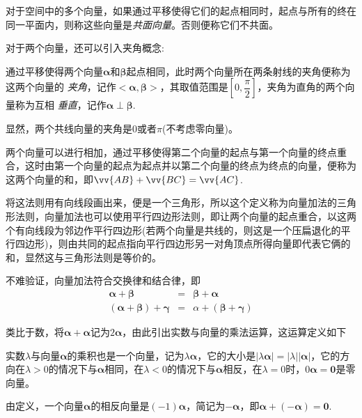 \begin{definition}
  对于空间中的多个向量，如果通过平移使得它们的起点相同时，起点与所有的终在同一平面内，则称这些向量是\emph{共面向量}。否则便称它们不共面。
\end{definition}

对于两个向量，还可以引入夹角概念:
\begin{definition}
  通过平移使得两个向量$\bm{\alpha}$和$\bm{\beta}$起点相同，此时两个向量所在两条射线的夹角便称为这两个向量的 \emph{夹角}，记作$<\bm{\alpha},\bm{\beta}>$，其取值范围是$[0,\dfrac{\pi}{2}]$，夹角为直角的两个向量称为互相 \emph{垂直}，记作$\bm{\alpha} \perp \bm{\beta}$.
\end{definition}

显然，两个共线向量的夹角是0或者$\pi$(不考虑零向量)。

\begin{definition}
两个向量可以进行相加，通过平移使得第二个向量的起点与第一个向量的终点重合，这时由第一个向量的起点为起点并以第二个向量的终点为终点的向量，便称为这两个向量的和，即$\vv{AB}+\vv{BC}=\vv{AC}$.
\end{definition}

将这法则用有向线段画出来，便是一个三角形，所以这个定义称为向量加法的三角形法则，向量加法也可以使用平行四边形法则，即让两个向量的起点重合，以这两个有向线段为邻边作平行四边形(若两个向量是共线的，则这是一个压扁退化的平行四边形)，则由共同的起点指向平行四边形另一对角顶点所得向量即代表它俩的和，显然这与三角形法则是等价的。

不难验证，向量加法符合交换律和结合律，即
\begin{eqnarray*}
  \bm{\alpha} + \bm{\beta} & = & \bm{\beta}+\bm{\alpha} \\
  ( \bm{\alpha} + \bm{\beta} ) + \bm{\gamma} & = & \alpha + (\bm{\beta} + \bm{\gamma})
\end{eqnarray*}

类比于数，将$\bm{\alpha}+\bm{\alpha}$记为$2\bm{\alpha}$，由此引出实数与向量的乘法运算，这运算定义如下
\begin{definition}
  实数$\lambda$与向量$\bm{\alpha}$的乘积也是一个向量，记为$\lambda \bm{\alpha}$，它的大小是$|\lambda \bm{\alpha}| = |\lambda| |\bm{\alpha}|$，它的方向在$\lambda>0$的情况下与$\bm{\alpha}$相同，在$\lambda<0$的情况下与$\bm{\alpha}$相反，在$\lambda=0$时，$0\bm{\alpha} = \bm{0}$是零向量。
\end{definition}

由定义，一个向量$\bm{\alpha}$的相反向量是$(-1)\bm{\alpha}$，简记为$-\bm{\alpha}$，即$\bm{\alpha}+(-\bm{\alpha})=\bm{0}$.

